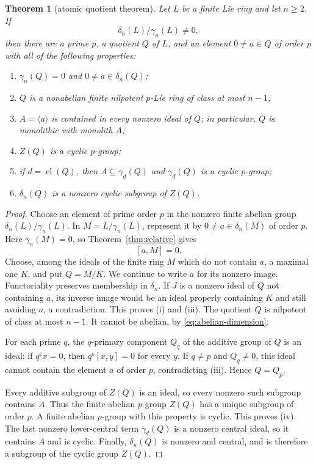 \documentclass[a4paper,11pt,reqno]{amsart}
\newtheorem{theorem}{Theorem}[section]
\theoremstyle{definition}
\theoremstyle{remark}
\newcommand{\dlt}{\delta}
\newcommand{\gm}{\gamma}
\newcommand{\cl}{\operatorname{cl}}
\begin{document}
\begin{theorem}[atomic quotient theorem]\label{thm:atomic}
Let $L$ be a finite Lie ring and let $n\geq2$.  If
\[
                         \dlt_n(L)/\gm_n(L)\ne0,
\]
then there are a prime $p$, a quotient $Q$ of $L$, and an element
$0\ne a\in Q$ of order $p$ with all of the following properties:
\begin{enumerate}[label=\textup{(\roman*)}]
\item $\gm_n(Q)=0$ and $0\ne a\in\dlt_n(Q)$;
\item $Q$ is a nonabelian finite nilpotent $p$-Lie ring of class at most
$n-1$;
\item $A=\langle a\rangle$ is contained in every nonzero ideal of $Q$;
in particular, $Q$ is monolithic with monolith $A$;
\item $Z(Q)$ is a cyclic $p$-group;
\item if $d=\cl(Q)$, then $A\subseteq\gm_d(Q)$ and
$\gm_d(Q)$ is a cyclic $p$-group;
\item $\dlt_n(Q)$ is a nonzero cyclic subgroup of $Z(Q)$.
\end{enumerate}
\end{theorem}

\begin{proof}
Choose an element of prime order $p$ in the nonzero finite abelian group
$\dlt_n(L)/\gm_n(L)$.  In
\(M=L/\gm_n(L)\), represent it by
$0\ne a\in\dlt_n(M)$ of order $p$.  Here $\gm_n(M)=0$, so
Theorem~\ref{thm:relative} gives
\[
                         [a,M]=0.
\]
Choose, among the ideals of the finite ring $M$ which do not contain $a$, a
maximal one $K$, and put $Q=M/K$.  We continue to write $a$ for its nonzero
image.  Functoriality preserves membership in $\dlt_n$.  If $J$ is a nonzero
ideal of $Q$ not containing $a$, its inverse image would be an ideal properly
containing $K$ and still avoiding $a$, a contradiction.  This proves (i) and
(iii).  The quotient $Q$ is nilpotent of class at most $n-1$.  It cannot be
abelian, by \eqref{eq:abelian-dimension}.

For each prime $q$, the $q$-primary component $Q_q$ of the additive group of
$Q$ is an ideal: if $q^e x=0$, then $q^e[x,y]=0$ for every $y$.  If
$q\ne p$ and $Q_q\ne0$, this ideal cannot contain the element $a$ of order
$p$, contradicting (iii).  Hence $Q=Q_p$.

Every additive subgroup of $Z(Q)$ is an ideal, so every nonzero such subgroup
contains $A$.  Thus the finite abelian $p$-group $Z(Q)$ has a unique subgroup
of order $p$.  A finite abelian $p$-group with this property is cyclic.  This
proves (iv).  The last nonzero lower-central term $\gm_d(Q)$ is a nonzero
central ideal, so it contains $A$ and is cyclic.  Finally,
$\dlt_n(Q)$ is nonzero and central, and is therefore a subgroup of the cyclic
group $Z(Q)$.
\end{proof}
\end{document}

